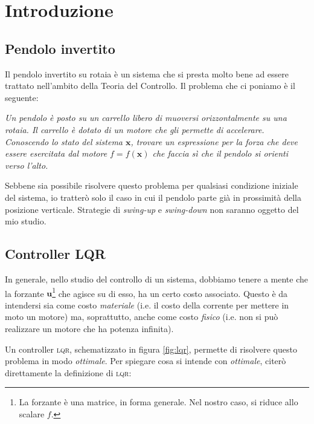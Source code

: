 \section{Introduzione}\label{sec:introduzione}
\subsection{Pendolo invertito}\label{subsec:intro-pendolo}
Il pendolo invertito su rotaia è un sistema che si presta molto bene ad essere trattato nell'ambito della Teoria del
Controllo.
Il problema che ci poniamo è il seguente:
\begin{framed}
\emph{
    Un pendolo è posto su un carrello libero di muoversi orizzontalmente su una rotaia.
    Il carrello è dotato di un motore che gli permette di accelerare. Conoscendo lo stato del sistema
    $\mathbf x$, trovare un espressione per la forza che deve essere esercitata dal motore $f = f(\mathbf x)$
    che faccia sì che il pendolo si orienti verso l'alto.
  }
\end{framed}
Sebbene sia possibile risolvere questo problema per qualsiasi condizione iniziale del sistema, io tratterò solo il
caso in cui il pendolo parte già in prossimità della posizione verticale. Strategie di \emph{swing-up} e
\emph{swing-down} non saranno oggetto del mio studio.

\subsection{Controller \textsc{LQR}}\label{subsec:intro-lqr}
In generale, nello studio del controllo di un sistema, dobbiamo tenere a mente che la forzante
$\mathbf u$\footnote{La forzante è una matrice, in forma generale. Nel nostro caso, si riduce allo scalare $f$.}
che agisce su di esso, ha un certo costo associato.
Questo è da intendersi sia come costo \emph{materiale} (i.e. il costo della corrente per mettere in moto
un motore) ma, soprattutto, anche come costo \emph{fisico} (i.e. non si può realizzare un motore che ha potenza
infinita).

Un controller \textsc{lqr}, schematizzato in figura \ref{fig:lqr}, permette di risolvere questo problema in modo \emph{ottimale}.
Per spiegare cosa si intende con \emph{ottimale}, citerò direttamente la definizione di \textsc{lqr}:

